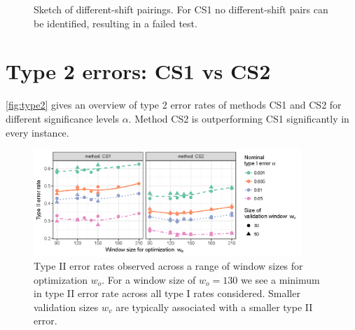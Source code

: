 \documentclass[12pt]{article}
\begin{document}
\begin{appendix}
\begin{figure}[hbtp]
\caption{\label{diff-shift-failure}Sketch of different-shift pairings. For CS1 no different-shift pairs can be identified, resulting in a failed test.}
\end{figure}

\newpage
\section{Type 2 errors: CS1 vs CS2}
\label{appendix:appxtype2}
\autoref{fig:type2} gives an overview of type 2 error rates of methods CS1 and CS2 for different significance levels $\alpha$. Method CS2 is outperforming CS1 significantly in every instance.

\begin{figure}[h]

{\centering \includegraphics[width=0.9\textwidth]{figures/type2-1} 

}

\caption{Type II error rates observed across a range of window sizes for optimization $w_o$. For a window size of $w_o = 130$ we see a minimum in type II error rate across all type I rates considered. Smaller validation sizes $w_v$ are typically associated with a smaller type II error.}\label{fig:type2}
\end{figure}

\end{appendix}

%
%
\end{document}
